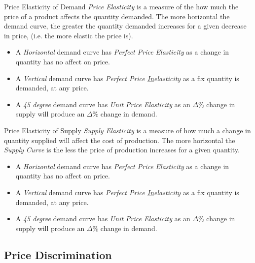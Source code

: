 \documentclass[11pt,a4paper]{article}
\begin{document}
  \begin{definition}{Price Elasticity of Demand}
    \textit{Price Elasticity} is a measure of the how much the price of a product affects the quantity demanded. The more horizontal the demand curve, the greater the quantity demanded increases for a given decrease in price, (i.e. the more elastic the price is).
    \begin{itemize}
      \item A \textit{Horizontal} demand curve has \textit{Perfect Price Elasticity} as a change in quantity has no affect on price.
      \item A \textit{Vertical} demand curve has \textit{Perfect Price \underline{In}elasticity} as a fix quantity is demanded, at any price.
      \item A \textit{45 degree} demand curve has \textit{Unit Price Elasticity} as an $\Delta\%$ change in supply will produce an $\Delta\%$ change in demand.
    \end{itemize}
  \end{definition}

  \begin{definition}{Price Elasticity of Supply}
    \textit{Supply Elasticity} is a measure of how much a change in quantity supplied will affect the cost of production. The more horizontal the \textit{Supply Curve} is the less the price of production increases for a given quantity.
    \begin{itemize}
      \item A \textit{Horizontal} demand curve has \textit{Perfect Price Elasticity} as a change in quantity has no affect on price.
      \item A \textit{Vertical} demand curve has \textit{Perfect Price \underline{In}elasticity} as a fix quantity is demanded, at any price.
      \item A \textit{45 degree} demand curve has \textit{Unit Price Elasticity} as an $\Delta\%$ change in supply will produce an $\Delta\%$ change in demand.
    \end{itemize}
  \end{definition}

\subsection{Price Discrimination}
\end{document}
